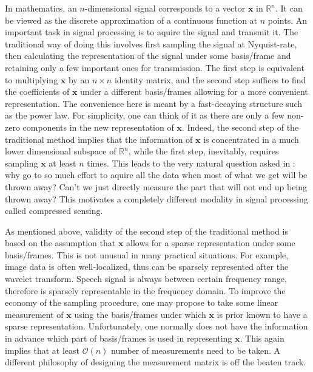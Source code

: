 \documentclass[11pt]{article}
\numberwithin{equation}{section}
\theoremstyle{plain}
\theoremstyle{definition}
\def\R{{\mathbb R}}
\def\R{{\mathbb R}}
\def\x{{\mathbf x}}
\begin{document}
In mathematics, an $n$-dimensional signal corresponds to a vector $\x$ in $\R^n$. It can be viewed as the discrete approximation of a continuous function at $n$ points. An important task in signal processing is to aquire the signal and transmit it. The traditional way of doing this involves first sampling the signal at Nyquist-rate, then calculating the representation of the signal under some basis/frame and retaining only a few important ones for transmission. The first step is equivalent to multiplying $\x$ by an $n\times n$ identity matrix, and the second step suffices to find the coefficients of $\x$ under a different basis/frames allowing for a more convenient representation. The convenience here is meant by a fast-decaying structure such as the power law. For simplicity, one can think of it as there are only a few non-zero components in the new representation of $\x$. Indeed, the second step of the traditional method implies that the information of $\x$ is concentrated in a much lower dimensional subspace of $\R^n$, while the first step, inevitably, requires sampling $\x$ at least $n$ times. This leads to the very natural question asked in \cite{donoho2006compressed}: why go to so much effort to aquire all the data when most of what we get will be thrown away? Can't we just directly measure the part that will not end up being thrown away? This motivates a completely different modality in signal processing called compressed sensing.

As mentioned above, validity of the second step of the traditional method is based on the assumption that $\x$ allows for a sparse representation under some basis/frames. This is not unusual in many practical situations. For example, image data is often well-localized, thus can be sparsely represented after the wavelet transform. Speech signal is always between certain frequency range, therefore is sparsely representable in the frequency domain. To improve the economy of the sampling procedure, one may propose to take some linear measurement of $\x$ using the basis/frames under which $\x$ is prior known to have a sparse representation. Unfortunately, one normally does not have the information in advance which part of basis/frames is used in representing $\x$. This again implies that at least $\mathcal{O}(n)$ number of measurements need to be taken. A different philosophy of designing the measurement matrix is off the beaten track. 
\end{document}
